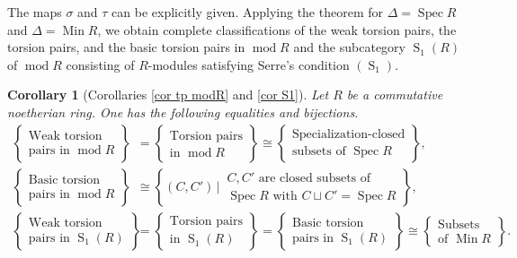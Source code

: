 \documentclass{amsart}
\newtheorem{cor}[thm]{Corollary}
\theoremstyle{definition}
\theoremstyle{remark}
\def\Min{\operatorname{Min}}
\def\mod{\operatorname{mod}}
\def\S{\operatorname{S}}
\def\Spec{\operatorname{Spec}}
\begin{document}
\noindent
The maps $\sigma$ and $\tau$ can be explicitly given.
Applying the theorem for $\Delta=\Spec R$ and $\Delta=\Min R$, we obtain complete classifications of the weak torsion pairs, the torsion pairs, and the basic torsion pairs in $\mod R$ and the subcategory $\S_1(R)$ of $\mod R$ consisting of $R$-modules satisfying Serre's condition $(\S_1)$.

\begin{cor}[Corollaries \ref{cor tp modR} and \ref{cor S1}]
Let $R$ be a commutative noetherian ring. 
One has the following equalities and bijections.
\begin{align*}
\left\{\begin{matrix}\text{Weak torsion}\\
\text{pairs in $\mod R$}\end{matrix}\right\}
&=\left\{\begin{matrix}\text{Torsion pairs}\\
\text{in $\mod R$}\end{matrix}\right\}
\cong\left\{\begin{matrix}\text{Specialization-closed}\\
\text{subsets of $\Spec R$}\end{matrix}\right\},
\\
\left\{\begin{matrix}\text{Basic torsion}\\
\text{pairs in $\mod R$}\end{matrix}\right\}
&\cong\left\{(C,C')\,\bigg|\,\begin{matrix}\text{$C,C'$ are closed subsets of}\\
\text{$\Spec R$ with $C\sqcup C'=\Spec R$}\end{matrix}\right\},\\
\left\{\begin{matrix}\text{Weak torsion}\\
\text{pairs in $\S_1(R)$}\end{matrix}\right\}
&=\left\{\begin{matrix}\text{Torsion pairs}\\
\text{in $\S_1(R)$}\end{matrix}\right\}
=\left\{\begin{matrix}\text{Basic torsion}\\
\text{pairs in $\S_1(R)$}\end{matrix}\right\}
\cong\left\{\begin{matrix}\text{Subsets}\\
\text{of $\Min R$}\end{matrix}\right\}.
\end{align*}
\end{cor}
\end{document}
